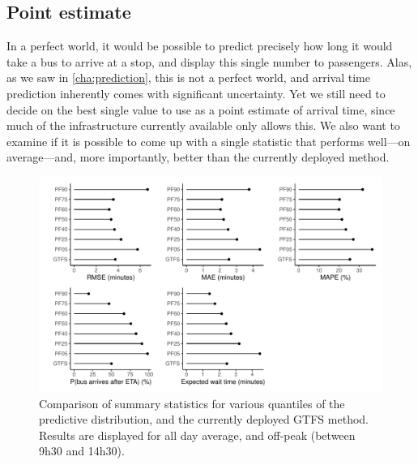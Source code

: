 \subsection{Point estimate}
\label{sec:etas-point}

In a perfect world, it would be possible to predict precisely how long it would take a bus to arrive at a stop, and display this single number to passengers. Alas, as we saw in \cref{cha:prediction}, this is not a perfect world, and arrival time prediction inherently comes with significant uncertainty. Yet we still need to decide on the best single value to use as a point estimate of arrival time, since much of the infrastructure currently available only allows this. We also want to examine if it is possible to come up with a single statistic that performs well---on average---and, more importantly, better than the currently deployed method.





\begin{knitrout}\small
{}\color{fgcolor}\begin{figure}

{\centering \includegraphics[width=\textwidth]{figure/eta_overall_results-1} 

}

\caption[Comparison of summary statistics for various quantiles of the predictive distribution, and the currently deployed GTFS method]{Comparison of summary statistics for various quantiles of the predictive distribution, and the currently deployed GTFS method. Results are displayed for all day average, and off-peak (between 9h30 and 14h30).}\label{fig:eta_overall_results}
\end{figure}


\end{knitrout}



